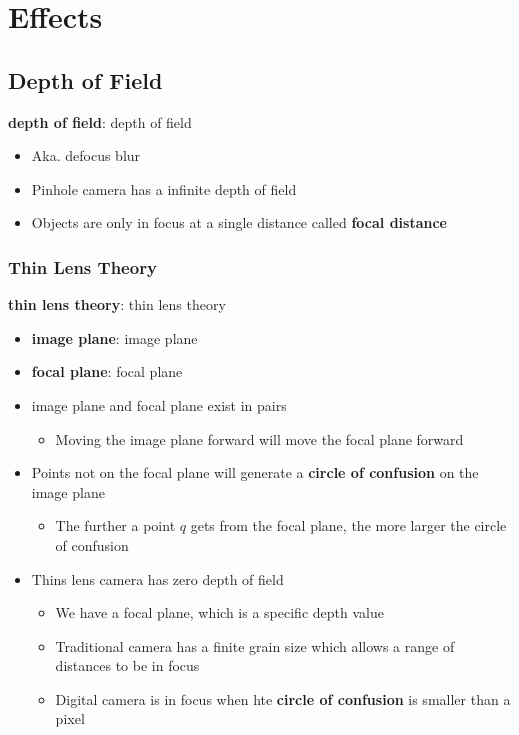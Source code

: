 \chapter{Effects}

\section{Depth of Field}

  \textbf{\Gls{depth of field}}: \glsdesc{depth of field}

  \begin{itemize}
    \item Aka. defocus blur
    \item Pinhole camera has a infinite \gls{depth of field}
    \item Objects are only in focus at a single distance called
    \textbf{focal distance}
  \end{itemize}

  \subsection{Thin Lens Theory}

    \textbf{\Gls{thin lens theory}}: \glsdesc{thin lens theory}

    \begin{itemize}
      \item \textbf{\Gls{image plane}}: \glsdesc{image plane}
      \item \textbf{\Gls{focal plane}}: \glsdesc{focal plane}
      \item \Gls{image plane} and \gls{focal plane} exist in pairs
      \begin{itemize}
        \item Moving the \gls{image plane} forward will move the
        \gls{focal plane} forward
      \end{itemize}

      \item Points not on the focal plane will generate a
      \textbf{circle of confusion} on the \gls{image plane}
      \begin{itemize}
        \item The further a point $ q $ gets from the \gls{focal plane}, the
        more larger the circle of confusion
      \end{itemize}

      \item Thins lens camera has zero \gls{depth of field}
      \begin{itemize}
        \item We have a \gls{focal plane}, which is a specific depth value
        \item Traditional camera has a finite grain size which allows a range of
        distances to be in focus
        \item Digital camera is in focus when hte \textbf{circle of confusion}
        is smaller than a pixel
      \end{itemize}
    \end{itemize}

